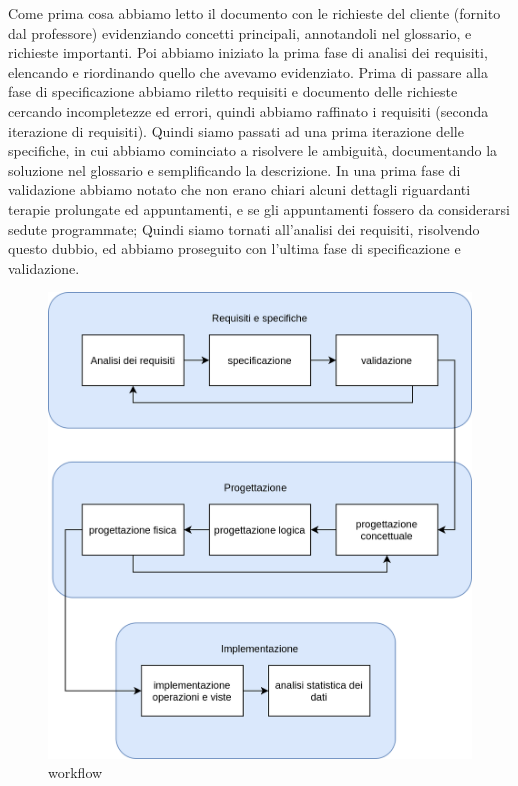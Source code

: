 \documentclass[11pt]{article}
\begin{document}
Come prima cosa abbiamo letto il documento con le richieste del cliente (fornito dal professore)
evidenziando concetti principali, annotandoli nel glossario, e richieste importanti. Poi abbiamo iniziato la prima fase di 
analisi dei requisiti, elencando e riordinando quello che avevamo evidenziato.
Prima di passare alla fase di specificazione abbiamo riletto requisiti e documento delle richieste cercando
incompletezze ed errori, quindi abbiamo raffinato i requisiti (seconda iterazione di requisiti).
Quindi siamo passati ad una prima iterazione delle specifiche, in cui abbiamo cominciato a
risolvere le ambiguità, documentando la soluzione nel glossario e semplificando la descrizione.
In una prima fase di validazione abbiamo notato che non erano chiari alcuni dettagli riguardanti
terapie prolungate ed appuntamenti, e se gli appuntamenti fossero da considerarsi sedute programmate;
Quindi siamo tornati all'analisi dei requisiti, risolvendo questo dubbio, ed abbiamo proseguito
con l'ultima fase di specificazione e validazione.

\begin{figure}[H]
    \includegraphics[width=\linewidth]{images/workflow.png}
    \caption{workflow}
    \label{fig:workflow}
\end{figure}
\end{document}
